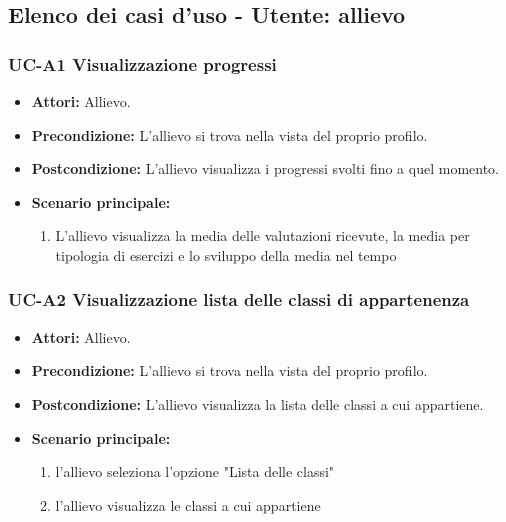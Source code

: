 \subsection{Elenco dei casi d'uso - Utente: allievo}
	\subsubsection{UC-A1 Visualizzazione progressi}
	\begin{itemize}
			\item \textbf{Attori:} Allievo.
			\item \textbf{Precondizione:} L'allievo si trova nella vista del proprio profilo.
			\item \textbf{Postcondizione:} L'allievo visualizza i progressi svolti fino a quel momento.
			\item \textbf{Scenario principale:}
				\begin{enumerate}
					\item L'allievo visualizza la media delle valutazioni ricevute, la media per tipologia di esercizi e lo sviluppo della media nel tempo
				\end{enumerate}
	\end{itemize}
	
	\subsubsection{UC-A2 Visualizzazione lista delle classi di appartenenza}
		\begin{itemize}
			\item \textbf{Attori:} Allievo.
			\item \textbf{Precondizione:} L'allievo si trova nella vista del proprio profilo.
			\item \textbf{Postcondizione:} L'allievo visualizza la lista delle classi a cui appartiene.
			\item \textbf{Scenario principale:}
			\begin{enumerate}
				\item l'allievo seleziona l'opzione "Lista delle classi"
				\item l'allievo visualizza le classi a cui appartiene
			\end{enumerate}
		\end{itemize}			

